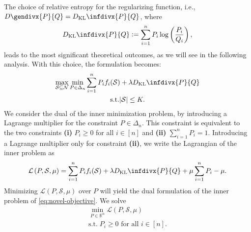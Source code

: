 \documentclass[letter,11pt]{article}
\newcommand{\infdiv}{D_{\text{KL}}\infdivx}
\newcommand{\gendiv}{D\gendivx}
\def\R{{\mathbb{R}}}
\def\lp{\left(}
\def\rp{\right)}
\def\R{\mathbb{R}}
\def\sS{\mathcal{S}}
\def\sN{\mathcal{N}}
\begin{document}
The choice of relative entropy for the regularizing function, i.e., $\gendiv{P}{Q} = \infdiv{P}{Q}$, where 
\begin{equation}
\infdiv{P}{Q} \vcentcolon= \sum_{i=1}^n P_i \log\lp\frac{P_i}{Q_i}\rp,
\end{equation}
leads to the most significant theoretical outcomes, as we will see in the following analysis. With this choice, the formulation becomes:
\begin{equation}\label{eq:novel-objective}
\begin{gathered}
\max_{\sS\subseteq\sN}\min_{P\in\Delta_n} \sum^n_{i=1} P_i f_i(\sS) + \lambda \infdiv{P}{Q} \\
\text{s.t.}|\sS| \leq K.
\end{gathered}
\end{equation}
We consider the dual of the inner minimization problem, by introducing a Lagrange multiplier for the constraint $P \in \Delta_n$. This constraint is equivalent to the two constraints \textbf{(i)} $P_i \geq 0$ for all $i \in [n]$ and \textbf{(ii)}  $\sum_{i=1}^n P_i = 1.$ Introducing a Lagrange multiplier only for constraint \textbf{(ii)}, we write the Lagrangian of the inner problem as
\begin{equation}
\mathcal{L}\lp P, \sS, \mu\rp = \sum_{i=1}^n P_i f_i(\sS) + \lambda \infdiv{P}{Q} + \mu\sum_{i=1}^nP_i - \mu.
\end{equation}
Minimizing $\mathcal{L}(P, \sS, \mu)$ over $P$ will yield the dual formulation of the inner problem of \eqref{eq:novel-objective}. We solve
\begin{equation}
\begin{gathered}
\min_{P\in \R^n} \mathcal{L}\lp P, \sS, \mu\rp \\
\text{s.t.}\; P_i \geq 0 \text{ for all }i \in [n].
\end{gathered}
\end{equation}
\end{document}
